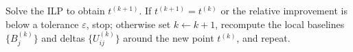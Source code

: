 Solve the ILP to obtain $t^{(k+1)}$. If $t^{(k+1)}=t^{(k)}$ or the relative improvement is below a tolerance $\varepsilon$, stop; otherwise set $k\leftarrow k{+}1$, recompute the local baselines $\{B_j^{(k)}\}$ and deltas $\{U_{ij}^{(k)}\}$ around the new point $t^{(k)}$, and repeat.























